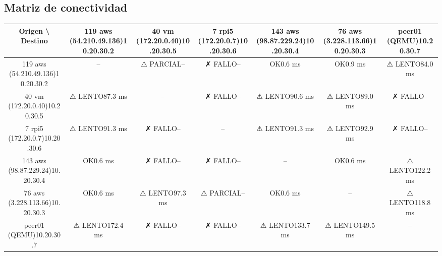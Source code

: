 \documentclass[11pt,a4paper]{article}
\begin{document}
\subsection{Matriz de conectividad}
\begin{longtable}{|c|c|c|c|c|c|c|}
\hline
Origen \textbackslash{} Destino & 119 aws (54.210.49.136)10.20.30.2 & 40 vm (172.20.0.40)10.20.30.5 & 7 rpi5 (172.20.0.7)10.20.30.6 & 143 aws (98.87.229.24)10.20.30.4 & 76 aws (3.228.113.66)10.20.30.3 & peer01 (QEMU)10.20.30.7 \\ \hline
119 aws (54.210.49.136)10.20.30.2 & -- & ⚠ PARCIAL-- & ✗ FALLO-- & OK0.6 ms & OK0.9 ms & ⚠ LENTO84.0 ms \\ \hline
40 vm (172.20.0.40)10.20.30.5 & ⚠ LENTO87.3 ms & -- & ✗ FALLO-- & ⚠ LENTO90.6 ms & ⚠ LENTO89.0 ms & ✗ FALLO-- \\ \hline
7 rpi5 (172.20.0.7)10.20.30.6 & ⚠ LENTO91.3 ms & ✗ FALLO-- & -- & ⚠ LENTO91.3 ms & ⚠ LENTO92.9 ms & ✗ FALLO-- \\ \hline
143 aws (98.87.229.24)10.20.30.4 & OK0.6 ms & ✗ FALLO-- & ✗ FALLO-- & -- & OK0.6 ms & ⚠ LENTO122.2 ms \\ \hline
76 aws (3.228.113.66)10.20.30.3 & OK0.6 ms & ⚠ LENTO97.3 ms & ⚠ PARCIAL-- & OK0.6 ms & -- & ⚠ LENTO118.8 ms \\ \hline
peer01 (QEMU)10.20.30.7 & ⚠ LENTO172.4 ms & ✗ FALLO-- & ✗ FALLO-- & ⚠ LENTO133.7 ms & ⚠ LENTO149.5 ms & -- \\ \hline
\end{longtable}
\end{document}

